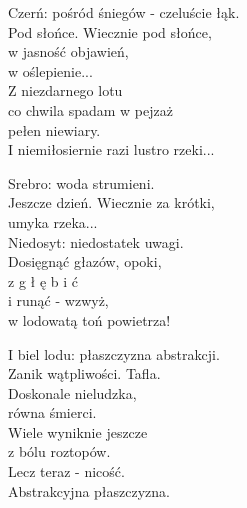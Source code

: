 \begin{text}
Czerń: pośród śniegów - czeluście łąk.\\
Pod słońce. Wiecznie pod słońce,\\
w jasność objawień,\\
w oślepienie...\\
Z niezdarnego lotu\\
co chwila spadam w pejzaż\\
pełen niewiary.\\
I niemiłosiernie razi lustro rzeki...

Srebro: woda strumieni.\\
Jeszcze dzień. Wiecznie za krótki,\\
umyka rzeka...\\
Niedosyt: niedostatek uwagi.\\
Dosięgnąć głazów, opoki,\\
z g ł ę b i ć\\
i runąć - wzwyż,\\
w lodowatą toń powietrza!

I biel lodu: płaszczyzna abstrakcji.\\
Zanik wątpliwości. Tafla.\\
Doskonale nieludzka,\\
równa śmierci.\\
Wiele wyniknie jeszcze\\
z bólu roztopów.\\
Lecz teraz - nicość.\\
Abstrakcyjna płaszczyzna.
\end{text}
\begin{chord}
\end{chord}